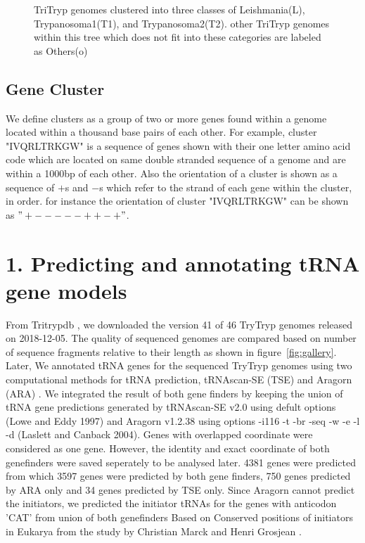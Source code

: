 \documentclass[table,
12pt, %
a4paper, %
oneside, %
headinclude,footinclude, %
BCOR5mm, %
]{scrartcl}
\begin{document}
\begin{figure}[H]
  \centering
  \caption[]{TriTryp genomes clustered into three classes of Leishmania(L), Trypanosoma1(T1), and Trypanosoma2(T2). other TriTryp genomes within this tree which does not fit into these categories are labeled as Others(o)}
  \label{fig:tree}
\end{figure}

\subsection{Gene Cluster}
We define clusters as a group of two or more genes found within a genome located within a thousand base pairs of each other. For example, cluster "IVQRLTRKGW" is a sequence of genes shown with their one letter amino acid code which are located on same double stranded sequence of a genome and are within a 1000bp of each other. Also the orientation of a cluster is shown as a sequence of $+$s and $-$s which refer to the strand of each gene within the cluster, in order. for instance the orientation of cluster "IVQRLTRKGW" can be shown as $"+-----++-+"$.



\section{\textbf{1. Predicting and annotating tRNA gene models}}
From Tritrypdb \cite{Aslett2010TriTrypDBAF}, we downloaded the version 41 of 46 TryTryp genomes released on 2018-12-05. The quality of sequenced genomes are compared based on number of sequence fragments relative to their length as shown in figure~\ref{fig:gallery}. Later, We annotated tRNA genes for the sequenced TryTryp genomes using two computational methods for tRNA prediction, tRNAscan-SE (TSE) \cite{trnascan} and Aragorn (ARA) \cite{aragorn}. We integrated the result of both gene finders by keeping the union of tRNA gene predictions generated by tRNAscan-SE v2.0 using defult options (Lowe and Eddy 1997) and Aragorn v1.2.38 using options -i116 -t -br -seq -w -e -l -d (Laslett and Canback 2004). Genes with overlapped coordinate were considered as one gene. However, the identity and exact coordinate of both genefinders were saved seperately to be analysed later. 4381 genes were predicted from which 3597 genes were predicted by both gene finders, 750 genes predicted by ARA only and 34 genes predicted by TSE only. Since Aragorn cannot predict the initiators, we predicted the initiator tRNAs for the genes with anticodon 'CAT' from union of both genefinders Based on Conserved positions of initiators in Eukarya from the study by Christian Marck and Henri Grosjean \cite{tRNomics}.
\end{document}
